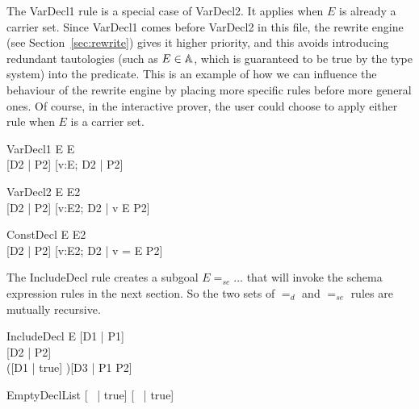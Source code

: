 \documentclass{entcs}
\newcommand{\sexprUnfoldsTo}{\mathrel{=_{se}}}
\newcommand{\declListUnfoldsTo}{\mathrel{=_d}}
\begin{document}
The VarDecl1 rule is a special case of VarDecl2.  It applies when $E$ is
already a carrier set.  Since VarDecl1 comes before VarDecl2 in this file,
the rewrite engine (see Section~\ref{sec:rewrite}) gives it higher
priority, and this avoids introducing redundant tautologies (such as $E \in
{\mathbb A}$, which is guaranteed to be true by the type system) into the
predicate.  This is an example of how we can influence the behaviour of the
rewrite engine by placing more specific rules before more general ones.  Of
course, in the interactive prover, the user could choose to apply either
rule when $E$ is a carrier set.

\begin{zedrule}{VarDecl1}
   E \hasType \power E \\
   [D1 | true] \declListUnfoldsTo [D2 | P2]
\derives
   [v:E; D1 | true] \declListUnfoldsTo [v:E; D2 |  P2]
\end{zedrule}

\begin{zedrule}{VarDecl2}
   E \hasType \power E2 \\
   [D1 | true] \declListUnfoldsTo [D2 | P2]
\derives
   [v:E; D1 | true] \declListUnfoldsTo [v:E2; D2 |  v \in E \land P2]
\end{zedrule}

\begin{zedrule}{ConstDecl}
   E \hasType E2 \\
   [D1 | true] \declListUnfoldsTo [D2 | P2]
\derives
   [v==E; D1 | true] \declListUnfoldsTo [v:E2; D2 |  v = E \land P2]
\end{zedrule}

The IncludeDecl rule creates a subgoal $E \sexprUnfoldsTo \ldots$ that
will invoke the schema expression rules in the next section.  So the
two sets of $\declListUnfoldsTo$ and $\sexprUnfoldsTo$ rules are
mutually recursive.

\begin{zedrule}{IncludeDecl}
   E \sexprUnfoldsTo [D1 | P1] \\
   [D | true] \declListUnfoldsTo [D2 | P2] \\
   ([D1 | true] \land [D2 | true])\hasType \power [D3 | true] 
\derives
   [E; D | true] \declListUnfoldsTo [D3 |  P1 \land P2]
\end{zedrule}

\begin{zedrule}{EmptyDeclList}
   [~ | true] \declListUnfoldsTo [~ | true]
\end{zedrule}
\end{document}
